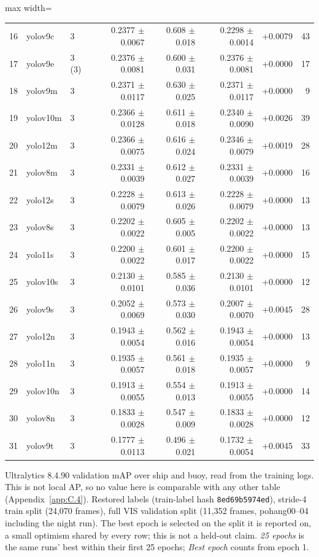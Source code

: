 \documentclass[journal,onecolumn]{IEEEtran}
\begin{document}
\begin{table}[htbp]
\begin{adjustbox}{max width=\linewidth}
\begin{tabular}{rllrrrrr}
16 & yolov9c & 3 & 0.2377 $\pm$ 0.0067 & 0.608 $\pm$ 0.018 & 0.2298 $\pm$ 0.0014 & +0.0079 & 43 \\
17 & yolov9e & 3 (3\textdagger{}) & 0.2376 $\pm$ 0.0081 & 0.600 $\pm$ 0.031 & 0.2376 $\pm$ 0.0081 & +0.0000 & 17 \\
18 & yolov9m & 3 & 0.2371 $\pm$ 0.0117 & 0.630 $\pm$ 0.025 & 0.2371 $\pm$ 0.0117 & +0.0000 & 9 \\
19 & yolov10m & 3 & 0.2366 $\pm$ 0.0128 & 0.611 $\pm$ 0.018 & 0.2340 $\pm$ 0.0090 & +0.0026 & 39 \\
20 & yolo12m & 3 & 0.2366 $\pm$ 0.0075 & 0.616 $\pm$ 0.024 & 0.2346 $\pm$ 0.0079 & +0.0019 & 28 \\
21 & yolov8m & 3 & 0.2331 $\pm$ 0.0039 & 0.612 $\pm$ 0.027 & 0.2331 $\pm$ 0.0039 & +0.0000 & 16 \\
22 & yolo12s & 3 & 0.2228 $\pm$ 0.0079 & 0.613 $\pm$ 0.026 & 0.2228 $\pm$ 0.0079 & +0.0000 & 13 \\
23 & yolov8s & 3 & 0.2202 $\pm$ 0.0022 & 0.605 $\pm$ 0.005 & 0.2202 $\pm$ 0.0022 & +0.0000 & 13 \\
24 & yolo11s & 3 & 0.2200 $\pm$ 0.0022 & 0.601 $\pm$ 0.017 & 0.2200 $\pm$ 0.0022 & +0.0000 & 15 \\
25 & yolov10s & 3 & 0.2130 $\pm$ 0.0101 & 0.585 $\pm$ 0.036 & 0.2130 $\pm$ 0.0101 & +0.0000 & 12 \\
26 & yolov9s & 3 & 0.2052 $\pm$ 0.0069 & 0.573 $\pm$ 0.030 & 0.2007 $\pm$ 0.0070 & +0.0045 & 28 \\
27 & yolo12n & 3 & 0.1943 $\pm$ 0.0054 & 0.562 $\pm$ 0.016 & 0.1943 $\pm$ 0.0054 & +0.0000 & 13 \\
28 & yolo11n & 3 & 0.1935 $\pm$ 0.0057 & 0.561 $\pm$ 0.018 & 0.1935 $\pm$ 0.0057 & +0.0000 & 9 \\
29 & yolov10n & 3 & 0.1913 $\pm$ 0.0055 & 0.554 $\pm$ 0.013 & 0.1913 $\pm$ 0.0055 & +0.0000 & 14 \\
30 & yolov8n & 3 & 0.1833 $\pm$ 0.0028 & 0.547 $\pm$ 0.009 & 0.1833 $\pm$ 0.0028 & +0.0000 & 12 \\
31 & yolov9t & 3 & 0.1777 $\pm$ 0.0113 & 0.496 $\pm$ 0.021 & 0.1732 $\pm$ 0.0054 & +0.0045 & 33 \\
\bottomrule
\end{tabular}
\end{adjustbox}
\par\smallskip\raggedright\footnotesize Ultralytics 8.4.90 validation mAP over ship and buoy, read from the training logs. This is not local AP, so no value here is comparable with any other table (Appendix~\ref{app:C.4}). Restored labels (train-label hash \texttt{8ed69b5974ed}), stride-4 train split (24,070 frames), full VIS validation split (11,352 frames, pohang00--04 including the night run). The best epoch is selected on the split it is reported on, a small optimism shared by every row; this is not a held-out claim. \emph{25 epochs} is the same runs' best within their first 25 epochs; \emph{Best epoch} counts from epoch 1.

\end{table}
\end{document}
